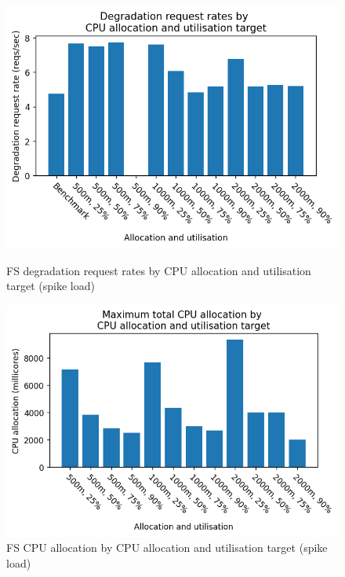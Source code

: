 \begin{figure}[H]
    \centering
    \begin{minipage}{.45\textwidth}
        \centering
        \includegraphics[width=\linewidth]{figures/fs-rau-spike-degradation-rates.png}
        \caption{FS degradation request rates by CPU allocation and utilisation target (spike load)}
        \label{figure:fs-resource-allocation-deg-comp-spike}
    \end{minipage}%
    \hspace{0.05\textwidth} %
    \begin{minipage}{.45\textwidth}
      \centering
      \includegraphics[width=\linewidth]{figures/fs-rau-cpu-allocation-spike.png}

      \caption{FS CPU allocation by CPU allocation and utilisation target (spike load)}
      \label{figure:fs-resource-allocation-spike-cpu-allocation}
    \end{minipage}
\end{figure}

